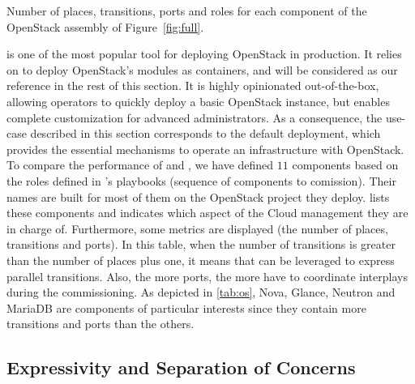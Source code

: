 \begin{table}
  \begin{center}
    
    \caption{Number of places, transitions, ports and roles for each \mad component
        of the OpenStack assembly of Figure~\ref{fig:full}.}
    \label{tab:os}
  \end{center}
\end{table}


\kolla is one of the most popular tool for deploying OpenStack in
production.  It relies on \ansible to deploy OpenStack's modules as
\docker containers, and will be considered as our reference in the
rest of this section. It is highly opinionated out-of-the-box,
allowing operators to quickly deploy a basic OpenStack instance, but
enables complete customization for advanced administrators. As a
consequence, the use-case described in this section corresponds to the
default \kolla deployment, which provides the essential mechanisms to
operate an infrastructure with OpenStack.
%
To compare the performance of \kolla and \mad, we have defined $11$
\mad components based on the \ansible roles defined in \kolla's
playbooks (\ie \ansible sequence of components to comission). Their
names are built for most of them on the OpenStack project they deploy.
 lists these components and indicates which aspect of the
Cloud management they are in charge of. Furthermore, some \mad metrics
are displayed (\ie the number of places, transitions and ports).
%
In this table, when the number of transitions is greater than the
number of places plus one, it means that \mad can be leveraged to
express parallel transitions. Also, the more ports, the more \mad have
to coordinate interplays during the commissioning. As depicted in
\cref{tab:os}, Nova, Glance, Neutron and MariaDB are components of
particular interests since they contain more transitions and ports
than the others.

\subsection{Expressivity and Separation of Concerns}

